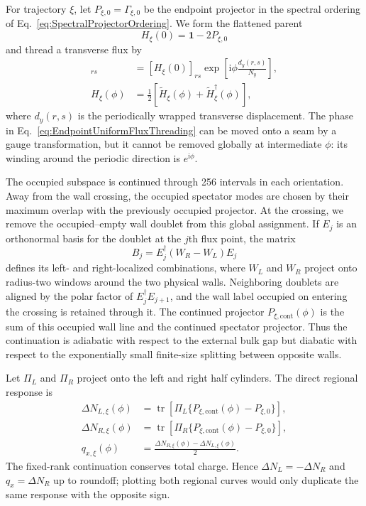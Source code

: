 \documentclass[aps,prb,twocolumn,superscriptaddress,longbibliography,floatfix]{revtex4-2}
\newcommand{\ii}{\mathrm{i}}
\theoremstyle{plain}
\theoremstyle{definition}
\theoremstyle{remark}
\begin{document}
For trajectory $\xi$, let $P_{\xi,0}=\Gamma_{\xi,0}$ be the endpoint
projector in the spectral ordering of Eq.~\eqref{eq:SpectralProjectorOrdering}.
We form the flattened parent
\begin{equation}
 H_{\xi}(0)=\mathbf{1}-2P_{\xi,0}
 \label{eq:EndpointFlattenedParent}
\end{equation}
and thread a transverse flux by
\begin{align}
 [\widetilde H_{\xi}(\phi)]_{rs}
 &=[H_{\xi}(0)]_{rs}
 \exp\!\left[\ii\phi\frac{d_y(r,s)}{N_y}\right],\nonumber\\
 H_{\xi}(\phi)
 &=\frac{1}{2}\left[\widetilde H_{\xi}(\phi)
 +\widetilde H_{\xi}^{\dagger}(\phi)\right],
 \label{eq:EndpointUniformFluxThreading}
\end{align}
where $d_y(r,s)$ is the periodically wrapped transverse displacement.  The
phase in Eq.~\eqref{eq:EndpointUniformFluxThreading} can be moved onto a seam
by a gauge transformation, but it cannot be removed globally at intermediate
$\phi$: its winding around the periodic direction is $e^{\ii\phi}$.

The occupied subspace is continued through 256 intervals in each orientation.
Away from the wall crossing, the occupied spectator modes are chosen by their
maximum overlap with the previously occupied projector.  At the crossing, we
remove the occupied--empty wall doublet from this global assignment.  If
$E_j$ is an orthonormal basis for the doublet at the $j$th flux point, the
matrix
\begin{equation}
 B_j=E_j^\dagger(W_R-W_L)E_j
 \label{eq:EndpointWallPolarization}
\end{equation}
defines its left- and right-localized combinations, where $W_L$ and $W_R$
project onto radius-two windows around the two physical walls.  Neighboring
doublets are aligned by the polar factor of $E_j^\dagger E_{j+1}$, and the
wall label occupied on entering the crossing is retained through it.  The
continued projector $P_{\xi,\mathrm{cont}}(\phi)$ is the sum of this occupied
wall line and the continued spectator projector.  Thus the continuation is
adiabatic with respect to the external bulk gap but diabatic with respect to
the exponentially small finite-size splitting between opposite walls.

Let $\Pi_L$ and $\Pi_R$ project onto the left and right half cylinders.  The
direct regional response is
\begin{align}
 \Delta N_{L,\xi}(\phi)
 &=\operatorname{tr}\!\left[\Pi_L
 \{P_{\xi,\mathrm{cont}}(\phi)-P_{\xi,0}\}\right],\nonumber\\
 \Delta N_{R,\xi}(\phi)
 &=\operatorname{tr}\!\left[\Pi_R
 \{P_{\xi,\mathrm{cont}}(\phi)-P_{\xi,0}\}\right],\nonumber\\
 q_{x,\xi}(\phi)
 &=\frac{\Delta N_{R,\xi}(\phi)-\Delta N_{L,\xi}(\phi)}{2}.
 \label{eq:EndpointSpectralWallCharge}
\end{align}
The fixed-rank continuation conserves total charge.  Hence
$\Delta N_L=-\Delta N_R$ and $q_x=\Delta N_R$ up to roundoff; plotting both
regional curves would only duplicate the same response with the opposite
sign.
\end{document}
